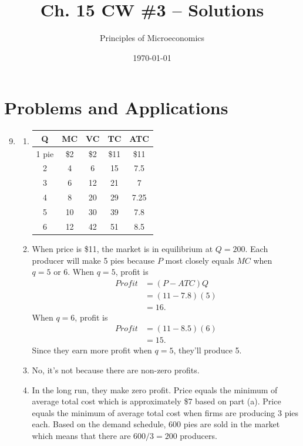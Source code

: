 \documentclass{article}
\title{Ch. 15 CW \#3 -- Solutions}
\author{Principles of Microeconomics}
\date{\today}
\begin{document}
\maketitle

\section*{Problems and Applications}

\begin{enumerate}

\setcounter{enumi}{8}
\item 

	\begin{enumerate}
	
	\item \phantom{x}

		\begin{center}
		\begin{tabular}{c | c | c | c | c}
		Q & MC& VC & TC & ATC \\
		\hline
		1 pie & \$2 & \$2 & \$11 & \$11\\
		2 & 4 & 6 & 15 & 7.5 \\
		3 & 6 & 12 & 21 & 7 \\
		4 & 8 & 20 & 29 & 7.25 \\
		5 & 10 & 30 & 39 & 7.8 \\
		6 & 12 & 42 & 51 & 8.5
		\end{tabular}
		\end{center}
	
	\item When price is \$11, the market is in equilibrium at $Q = 200$. Each producer will make 5 pies because $P$ most closely equals $MC$ when $q = 5 \text{ or } 6$. When $q = 5$, profit is
	\begin{align*}
	Profit &= (P - ATC)Q \\
	&= (11 - 7.8)(5) \\
	&= 16.
	\end{align*}
	When $q = 6$, profit is
	\begin{align*}
	Profit &= (11 - 8.5)(6) \\
	&= 15.
	\end{align*}
	Since they earn more profit when $q = 5$, they'll produce 5. 
	
	\item No, it's not because there are non-zero profits.
	
	\item In the long run, they make zero profit. Price equals the minimum of average total cost which is approximately \$7 based on part (a). Price equals the minimum of average total cost when firms are producing 3 pies each. Based on the demand schedule, 600 pies are sold in the market which means that there are $600/3 = 200$ producers.
	

\end{enumerate}
\end{enumerate}
\end{document}
